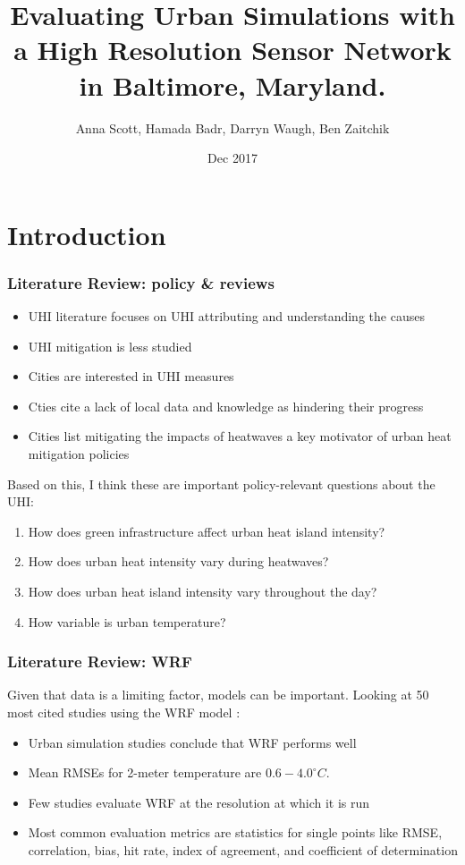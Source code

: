 \documentclass[aspectratio=169, 10pt]{beamer}
\title{Evaluating Urban Simulations with a High Resolution Sensor Network in Baltimore, Maryland.}
\subtitle{}
\date{Dec 2017}
\author{Anna Scott, Hamada Badr, Darryn Waugh, Ben Zaitchik}
\institute{annascott@jhu.edu }
\begin{document}
\maketitle



\section{Introduction}

\begin{frame}
\frametitle{Literature Review: policy \& reviews}
\begin{itemize}
\item UHI literature focuses on UHI attributing and understanding the causes 
\item UHI mitigation is less studied 
\item Cities are interested in UHI measures
\item Cties cite a lack of local data and knowledge as hindering their progress %
\item Cities list mitigating the impacts of heatwaves a key motivator of urban heat mitigation policies %
\end{itemize}
\end{frame}

\begin{frame}
Based on this, I think these are important policy-relevant questions about the UHI:  
\begin{enumerate}
\item How does green infrastructure affect urban heat island intensity? 
\item How does urban heat intensity vary during heatwaves? 
\item How does urban heat island intensity vary throughout the day? 
\item How variable is urban temperature? 

\end{enumerate}
\end{frame}

\begin{frame}[label=intro]
\frametitle{Literature Review: WRF}
Given that data is a limiting factor, models can be important. Looking at 50 most cited studies using the WRF model :
\begin{itemize}
\item Urban simulation studies conclude that WRF performs well

\item Mean RMSEs for 2-meter temperature are $0.6-4.0^\circ C$.
 
\item Few studies evaluate WRF at the resolution at which it is run 

\item Most common evaluation metrics are statistics for single points like RMSE, correlation, bias, hit rate, index of agreement, and coefficient of determination
\end{itemize}

\end{frame}
\end{document}
